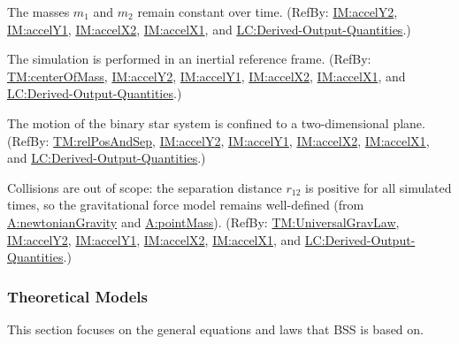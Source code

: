 \documentclass[12pt]{article}
\begin{document}
\begin{description}[font=\normalfont]
\item[constantMass:\phantomsection\label{constantMass}]{The masses ${m_{1}}$ and ${m_{2}}$ remain constant over time. (RefBy: \hyperref[IM:accelY2]{IM:accelY2}, \hyperref[IM:accelY1]{IM:accelY1}, \hyperref[IM:accelX2]{IM:accelX2}, \hyperref[IM:accelX1]{IM:accelX1}, and \hyperref[lcDerivedOutputs]{LC:Derived-Output-Quantities}.)}
\item[inertialFrame:\phantomsection\label{inertialFrame}]{The simulation is performed in an inertial reference frame. (RefBy: \hyperref[TM:centerOfMass]{TM:centerOfMass}, \hyperref[IM:accelY2]{IM:accelY2}, \hyperref[IM:accelY1]{IM:accelY1}, \hyperref[IM:accelX2]{IM:accelX2}, \hyperref[IM:accelX1]{IM:accelX1}, and \hyperref[lcDerivedOutputs]{LC:Derived-Output-Quantities}.)}
\item[planar:\phantomsection\label{planar}]{The motion of the binary star system is confined to a two-dimensional plane. (RefBy: \hyperref[TM:relPosAndSep]{TM:relPosAndSep}, \hyperref[IM:accelY2]{IM:accelY2}, \hyperref[IM:accelY1]{IM:accelY1}, \hyperref[IM:accelX2]{IM:accelX2}, \hyperref[IM:accelX1]{IM:accelX1}, and \hyperref[lcDerivedOutputs]{LC:Derived-Output-Quantities}.)}
\item[nonzeroSeparation:\phantomsection\label{nonzeroSeparation}]{Collisions are out of scope: the separation distance ${r_{12}}$ is positive for all simulated times, so the gravitational force model remains well-defined (from \hyperref[newtonianGravity]{A:newtonianGravity} and \hyperref[pointMass]{A:pointMass}). (RefBy: \hyperref[TM:UniversalGravLaw]{TM:UniversalGravLaw}, \hyperref[IM:accelY2]{IM:accelY2}, \hyperref[IM:accelY1]{IM:accelY1}, \hyperref[IM:accelX2]{IM:accelX2}, \hyperref[IM:accelX1]{IM:accelX1}, and \hyperref[lcDerivedOutputs]{LC:Derived-Output-Quantities}.)}
\end{description}
\subsubsection{Theoretical Models}
\label{Sec:TMs}
This section focuses on the general equations and laws that BSS is based on.
\end{document}
